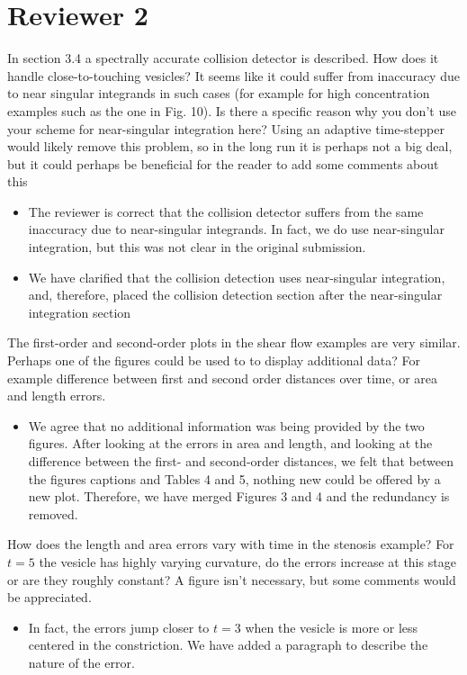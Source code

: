 \documentclass[11pt]{article}
\newcommand{\comment}[1]{{\color{blue} #1}}
\begin{document}
\section*{Reviewer 2}
\comment{In section 3.4 a spectrally accurate collision detector is
described. How does it handle close-to-touching vesicles? It seems like
it could suffer from inaccuracy due to near singular integrands in such
cases (for example for high concentration examples such as the one in
Fig. 10). Is there a specific reason why you don't use your scheme for
near-singular integration here? Using an adaptive time-stepper would
likely remove this problem, so in the long run it is perhaps not a big
deal, but it could perhaps be beneficial for the reader to add some
comments about this}
\begin{itemize}
  \item The reviewer is correct that the collision detector suffers
  from the same inaccuracy due to near-singular integrands.  In fact,
  we do use near-singular integration, but this was not clear in the
  original submission.

  \item We have clarified that the collision detection uses
  near-singular integration, and, therefore, placed the collision
  detection section after the near-singular integration section
\end{itemize}

\comment{The first-order and second-order plots in the shear flow
examples are very similar. Perhaps one of the figures could be used to
to display additional data? For example difference between first and
second order distances over time, or area and length errors.}
\begin{itemize}
  \item We agree that no additional information was being provided by
  the two figures.  After looking at the errors in area and length, and
  looking at the difference between the first- and second-order
  distances, we felt that between the figures captions and Tables 4 and
  5, nothing new could be offered by a new plot.  Therefore, we have
  merged Figures 3 and 4 and the redundancy is removed.
\end{itemize}

\comment{How does the length and area errors vary with time in the
stenosis example? For $t = 5$ the vesicle has highly varying curvature,
do the errors increase at this stage or are they roughly constant? A
figure isn't necessary, but some comments would be appreciated.}
\begin{itemize}
  \item In fact, the errors jump closer to $t=3$ when the vesicle is
  more or less centered in the constriction.  We have added a paragraph
  to describe the nature of the error.
\end{itemize}
\end{document}
